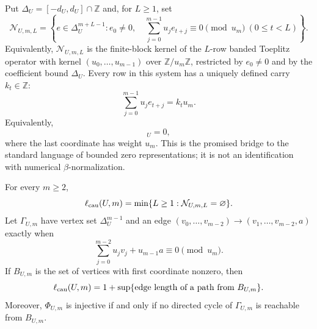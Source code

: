 Put $\Delta_U=[-d_U,d_U]\cap\mathbb Z$ and, for $L\ge1$, set
\begin{equation}
\mathcal N_{U,m,L}=\left\{e\in\Delta_U^{m+L-1}:
 e_0\ne0,\quad
 \sum_{j=0}^{m-1}u_je_{t+j}\equiv0\pmod {u_m}
 \ (0\le t<L)\right\}.
\label{eq:pisot-bad-sliding-set}
\end{equation}
Equivalently, $\mathcal N_{U,m,L}$ is the finite-block kernel of the
$L$-row banded Toeplitz operator with kernel
$(u_0,\ldots,u_{m-1})$ over $\mathbb Z/u_m\mathbb Z$, restricted by
$e_0\ne0$ and by the coefficient bound $\Delta_U$.
Every row in this system has a uniquely defined carry $k_t\in\mathbb Z$:
\begin{equation}
\sum_{j=0}^{m-1}u_je_{t+j}=k_tu_m.
\label{eq:pisot-window-carry}
\end{equation}
Equivalently,
\begin{equation}
[e_t,e_{t+1},\ldots,e_{t+m-1},-k_t]_U=0,
\label{eq:pisot-zero-word-bridge}
\end{equation}
where the last coordinate has weight $u_m$.  This is the promised bridge to
the standard language of bounded zero representations; it is not an
identification with numerical $\beta$-normalization.

\begin{lemma}
\label{lem:pisot-exact-collision-quotient}
For every $m\ge2$,
\begin{equation}
\ell_{\rm cau}(U,m)
=\min\{L\ge1:\mathcal N_{U,m,L}=\varnothing\}.
\label{eq:pisot-exact-depth}
\end{equation}
Let $\Gamma_{U,m}$ have vertex set $\Delta_U^{m-1}$ and an edge
$(v_0,\ldots,v_{m-2})\to(v_1,\ldots,v_{m-2},a)$ exactly when
\[
\sum_{j=0}^{m-2}u_jv_j+u_{m-1}a\equiv0\pmod {u_m}.
\]
If $B_{U,m}$ is the set of vertices with first coordinate nonzero, then
\begin{equation}
\ell_{\rm cau}(U,m)=1+\sup\{\text{edge length of a path from }B_{U,m}\}.
\label{eq:pisot-longest-path}
\end{equation}
Moreover, $\Phi_{U,m}$ is injective if and only if no directed cycle of
$\Gamma_{U,m}$ is reachable from $B_{U,m}$.
\end{lemma}

